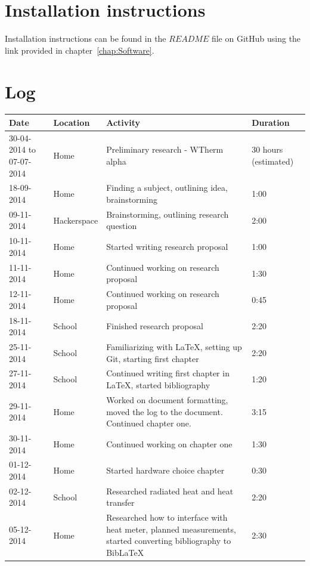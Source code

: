 \documentclass[12pt,a4paper,final]{report}
\begin{document}
\chapter{Installation instructions}
Installation instructions can be found in the $README$ file on GitHub using the link provided in chapter~\ref{chap:Software}.

\newpage
\chapter{Log}
\begingroup
	\setlength{\LTleft}{-20cm plus -1fill}
	\setlength{\LTright}{\LTleft}
    \begin{longtable}{ | p{2.5cm} | p{2.5cm} | p{5cm} | p{2cm} |}
    \hline
    Date & Location & Activity & Duration \\ 
    \hline
    30-04-2014 to 07-07-2014 & Home & Preliminary research - WTherm alpha & 30 hours (estimated) \\ 
    \hline 
    18-09-2014 & Home & Finding a subject, outlining idea, brainstorming & 1:00 \\ 
    \hline
    09-11-2014 & Hackerspace & Brainstorming, outlining research question & 2:00 \\
    \hline
    10-11-2014 & Home & Started writing research proposal & 1:00 \\
	\hline
	11-11-2014 & Home & Continued working on research proposal & 1:30 \\
	\hline
	12-11-2014 & Home & Continued working on research proposal & 0:45	\\
	\hline
	18-11-2014 & School & Finished research proposal & 2:20	\\
	\hline
	25-11-2014 & School & Familiarizing with \LaTeX, setting up Git, starting first chapter & 2:20 \\
	\hline
	27-11-2014 & School & Continued writing first chapter in \LaTeX , started bibliography & 1:20 \\
	\hline
	29-11-2014 & Home & Worked on document formatting, moved the log to the document. Continued chapter one. & 3:15 \\
	\hline
	30-11-2014 & Home & Continued working on chapter one & 1:30 \\
	\hline
	01-12-2014 & Home & Started hardware choice chapter & 0:30 \\
	\hline
	02-12-2014 & School & Researched radiated heat and heat transfer & 2:20 \\
	\hline
	05-12-2014 & Home & Researched how to interface with heat meter, planned measurements, started converting bibliography to Bib\LaTeX{} & 2:30 \\

\end{longtable}
\end{document}
